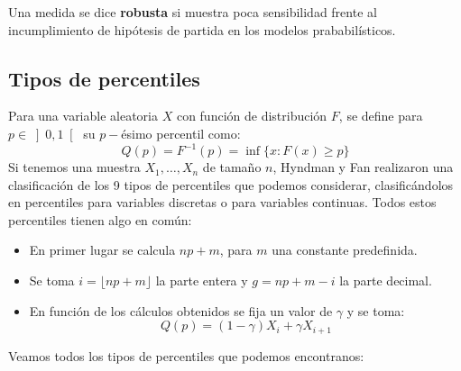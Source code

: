 \begin{definicion}
    Una medida se dice \textbf{robusta} si muestra poca sensibilidad frente al incumplimiento de hipótesis de partida en los modelos prababilísticos.
\end{definicion}

\subsection{Tipos de percentiles}
\noindent
Para una variable aleatoria $X$ con función de distribución $F$, se define para $p \in \left]0,1\right[$ su $p-$ésimo percentil como:
\begin{equation*}
    Q(p) = F^{-1}(p) = \inf\{x : F(x)\geq p\}
\end{equation*}
Si tenemos una muestra $X_1,\ldots,X_n$ de tamaño $n$, Hyndman y Fan realizaron una clasificación de los 9 tipos de percentiles que podemos considerar, clasificándolos en percentiles para variables discretas o para variables continuas. Todos estos percentiles tienen algo en común:
\begin{itemize}
    \item En primer lugar se calcula $np + m$, para $m$ una constante predefinida.
    \item Se toma $i = \lfloor np + m \rfloor$ la parte entera y $g = np + m - i$ la parte decimal.
    \item En función de los cálculos obtenidos se fija un valor de $\gamma$ y se toma:
        \begin{equation*}
            Q(p) = (1-\gamma) X_i + \gamma X_{i+1}
        \end{equation*}
\end{itemize}
Veamos todos los tipos de percentiles que podemos encontranos:
